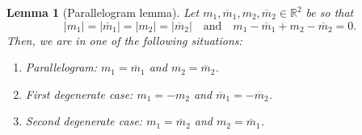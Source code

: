 \documentclass[a4paper,11pt]{amsart}
\numberwithin{equation}{section}
\newtheorem{lem}[thm]{Lemma}
\theoremstyle{definition}
\begin{document}
\begin{lem}[Parallelogram lemma] \label{lem:dia}
Let $m_1, \overline m_1, m_2,  \overline m_2 \in \mathbb R^2$ be so that
$$
|m_1| = |\overline m_1| = |m_2| = |\overline m_2|\quad\text{and}\quad m_1 -\overline m_1+m_2 -  \overline m_2 = 0.
$$
Then, we are in one of the following situations:
\begin{enumerate}
    \item[(i)] Parallelogram: $m_1 = \overline{m}_1$ and $m_2 = \overline{m}_2$.
    \item[(ii)] First degenerate case: $m_1 = - m_2$ and $\overline m_1 = - \overline m_2$.
    \item[(iii)] Second degenerate case: $m_1 = \overline m_2$ and $m_2 = \overline m_1$.
\end{enumerate}
\end{lem}
\end{document}
